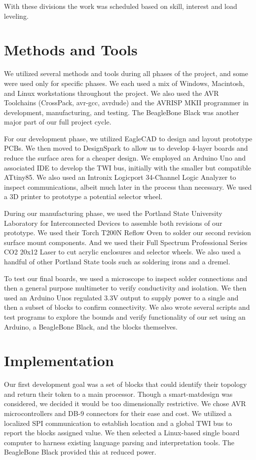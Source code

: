 \documentclass[12pt,a4paper]{article}
\begin{document}
With these divisions the work was scheduled based on skill, interest and load leveling.


\section{Methods and Tools}
We utilized several methods and tools during all phases of the project, and some were used only for specific phases. We each used a mix of Windows, Macintosh, and Linux workstations throughout the project. We also used the AVR Toolchains (CrossPack, avr-gcc, avrdude) and the AVRISP MKII programmer in development, manufacturing, and testing. The BeagleBone Black was another major part of our full project cycle.

For our development phase, we utilized EagleCAD to design and layout prototype PCBs. We then moved to DesignSpark to allow us to develop 4-layer boards and reduce the surface area for a cheaper design. We employed an Arduino Uno and associated IDE to develop the TWI bus, initially with the smaller but compatible ATtiny85. We also used an Intronix Logicport 34-Channel Logic Analyzer to inspect communications, albeit much later in the process than necessary. We used a 3D printer to prototype a potential selector wheel.

During our manufacturing phase, we used the Portland State University Laboratory for Interconnected Devices to assemble both revisions of our prototype. We used their Torch T200N Reflow Oven to solder our second revision surface mount components. And we used their Full Spectrum Professional Series CO2 20x12 Laser to cut acrylic enclosures and selector wheels. We also used a handful of other Portland State tools such as soldering irons and a dremel. 

To test our final boards, we used a microscope to inspect solder connections and then a general purpose multimeter to verify conductivity and isolation. We then used an Arduino Uno\textquotesingle s regulated 3.3V output to supply power to a single and then a subset of blocks to confirm connectivity. We also wrote several scripts and test programs to explore the bounds and verify functionality of our set using an Arduino, a BeagleBone Black, and the blocks themselves.
\section{Implementation}
Our first development goal was a set of blocks that could identify their topology and return their token to a main processor. Though a \textquotesingle smart-mat\textquotesingle design was considered, we decided it would be too dimensionally restrictive. We chose AVR microcontrollers and DB-9 connectors for their ease and cost. We utilized a localized SPI communication to establish location and a global TWI bus to report the block\textquotesingle s assigned value. We then selected a Linux-based single board computer to harness existing language parsing and interpretation tools. The BeagleBone Black provided this at reduced power.
\end{document}
